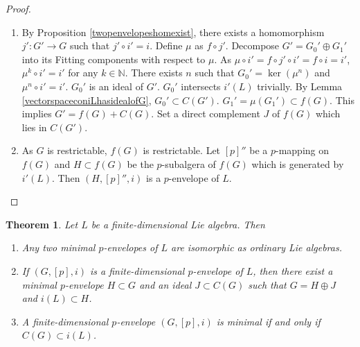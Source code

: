 \documentclass[12pt,MSc]{muthesis_2023}
\theoremstyle{plain}%
\newtheorem{Theorem}[FactCounter]{Theorem} %
\theoremstyle{definition}
\theoremstyle{remark}
\begin{document}
\begin{proof}
\begin{enumerate}
\item[(1)]
By Proposition \ref{twopenvelopeshomexist}, there exists a homomorphism $j': G' \rightarrow G$ such that $j'\circ i'=i$. Define $\mu$ as $f\circ j'$. Decompose $G'={G_0}'\oplus {G_1}'$ into its Fitting components with respect to $\mu$. As $\mu \circ i' = f\circ j' \circ i'=f\circ i=i'$, $\mu^k\circ i'=i'$ for any $k\in \mathbb{N}$. There exists $n$ such that ${G_0}'=\ker(\mu^n)$ and $\mu^n\circ i'=i'$. ${G_0}'$ is an ideal of $G'$. ${G_0}'$ intersects $i'(L)$ trivially. By Lemma \ref{vectorspaceconiLhasidealofG}, ${G_0}' \subset C(G')$. ${G_1}'=\mu({G_1}')\subset f(G)$. This implies $G'=f(G)+C(G)$. Set a direct complement $J$ of $f(G)$ which lies in $C(G')$.
\item[(2)]
As $G$ is restrictable, $f(G)$ is restrictable. Let $[p]''$ be a $p$-mapping on $f(G)$ and $H\subset f(G)$ be the $p$-subalgera of $f(G)$ which is generated by $i'(L)$. Then $(H, [p]'', i)$ is a $p$-envelope of $L$.
\end{enumerate}
\end{proof}

\begin{Theorem}
Let $L$ be a finite-dimensional Lie algebra. Then
\begin{enumerate}
\item[(1)]
Any two minimal $p$-envelopes of $L$ are isomorphic as ordinary Lie algebras.

\item[(2)]
If $(G, [p], i)$ is a finite-dimensional $p$-envelope of $L$, then there exist a minimal $p$-envelope $H \subset G$ and an ideal $J \subset C(G)$ such that $G= H\oplus J$ and $i(L)\subset H$.

\item[(3)]
A finite-dimensional $p$-envelope $(G, [p], i)$ is minimal if and only if $C(G)\subset i(L)$.
\end{enumerate}
\end{Theorem}
\end{document}
